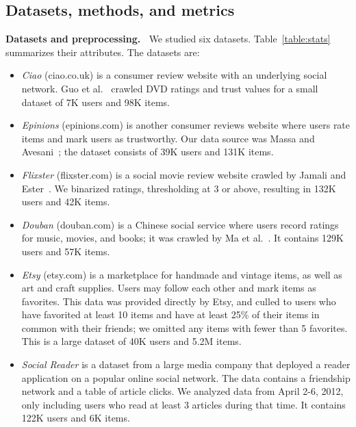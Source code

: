 \documentclass{sig-alternate-2013}
\newcommand{\mypar}[1]{\vspace{0.05in} \noindent \textbf{#1 \,}}
\begin{document}
\subsection{Datasets, methods, and metrics}

\mypar{Datasets and preprocessing.} We studied six datasets.
Table~\ref{table:stats} summarizes their attributes.  The datasets
are:
\begin{itemize}
\setlength\itemsep{2px}
\item \textit{Ciao} (ciao.co.uk) is a consumer review website with an
  underlying social network.  Guo et al.~\cite{guo2014etaf} crawled
 DVD ratings and trust values for a small dataset of 7K users and 98K items.

\item \textit{Epinions} (epinions.com)
  is another consumer reviews website where users rate items
  and mark users as trustworthy.  Our data source was Massa and Avesani~\cite{Massa2007};
  the dataset consists of 39K users and 131K items.

\item \textit{Flixster} (flixster.com) is a social movie review
  website crawled by Jamali and Ester~\cite{Jamali:2010}.  We
  binarized ratings, thresholding at 3 or above, resulting in 132K users and 42K items.

\item \textit{Douban} (douban.com) is a Chinese social service where
  users record ratings for music, movies, and books; it was crawled by
  Ma et al.~\cite{hao:sr}.  It contains 129K users and 57K items.

\item \textit{Etsy} (etsy.com) is a marketplace for handmade and
  vintage items, as well as art and craft supplies.  Users may follow
  each other and mark items as favorites.  This data was provided
  directly by Etsy, and culled to users who have favorited at least 10 items and
  have at least 25\% of their items in common with their friends; we
  omitted any items with fewer than 5 favorites.  This is a large dataset of 40K users
  and 5.2M items.

\item \textit{Social Reader} is a dataset from a large media company
  that deployed a reader application on a popular online social
  network.  The data contains a friendship network and a table of
  article clicks.  We analyzed data from April 2-6, 2012, only
  including users who read at least 3 articles during that time.
  It contains 122K users and 6K items.

\end{itemize}
\end{document}
